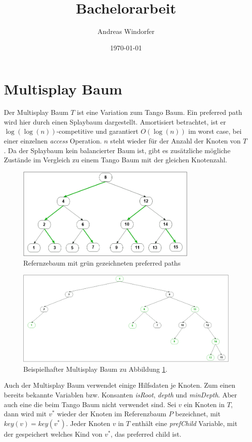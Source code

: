 \documentclass[a4paper,12pt]{article}
\title{Bachelorarbeit}
\author{
	Andreas Windorfer\\
}
\date{\today}
\begin{document}
\maketitle
\newpage

\newpage
\tableofcontents


\newpage


\section{Multisplay Baum}
Der Multisplay Baum \cite{multisplay} $T$ ist eine Variation zum Tango Baum. Ein preferred path wird hier durch einen Splaybaum dargestellt. Amortisiert betrachtet, ist er $\log\left(\log\left(n\right)\right)$-competitive und garantiert $O\left(\log \left(n\right)\right)$ im worst case, bei einer einzelnen {\textit{access}} Operation. $n$ steht wieder für der Anzahl der Knoten von $T$. Da der Splaybaum kein balancierter Baum ist, gibt es zusätzliche mögliche Zustände im Vergleich zu einem Tango Baum mit der gleichen Knotenzahl.
\begin{figure}[h]
	\centering
	\includegraphics[width= 0.8\textwidth]{"Medien/Multisplay/referenzTree"}
	\caption {Refernzebaum mit grün gezeichneten preferred paths }
	\label{fig:referenzTree}
\end{figure} 
\begin{figure}[h]
	\centering
	\includegraphics[width= 1\textwidth]{"Medien/Multisplay/pfadRepresentation"}
	\caption {Beispielhafter Multisplay Baum zu Abbildung \ref{fig:referenzTree}.}
	\label{fig:pfadRepresentation}
\end{figure} 
Auch der Multisplay Baum verwendet einige Hilfsdaten je Knoten. Zum einen bereits bekannte Variablen bzw. Konsanten \textit{isRoot}, \textit{depth} und \textit{minDepth}. Aber auch eine die beim Tango Baum nicht verwendet sind. Sei $v$ ein Knoten in $T$, dann wird mit $v^*$  wieder der Knoten im Referenzbaum $P$ bezeichnet, mit $\mathit{key}\left(v\right) = \mathit{key}\left(v^*\right)$. Jeder Knoten $v$ in $T$ enthält eine \textit{prefChild} Variable, mit der gespeichert welches Kind von $v^*$, das preferred child ist. 
\end{document}
